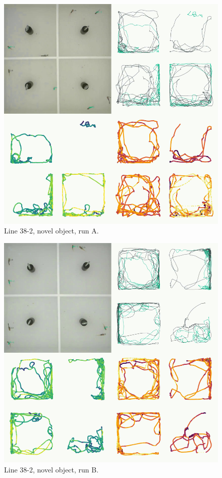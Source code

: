\documentclass[
]{book}
\begin{document}
\begin{figure}
\includegraphics[width=1\linewidth]{figs/mikk_behaviour/four_panel_plots/novel_object_20191112_1456_38-2_L_A_300} \caption{Line 38-2, novel object, run A.}\label{fig:4p-38-2-no-A}
\end{figure}



\begin{figure}
\includegraphics[width=1\linewidth]{figs/mikk_behaviour/four_panel_plots/novel_object_20191116_1203_38-2_L_B_300} \caption{Line 38-2, novel object, run B.}\label{fig:4p-38-2-no-B}
\end{figure}
\end{document}
